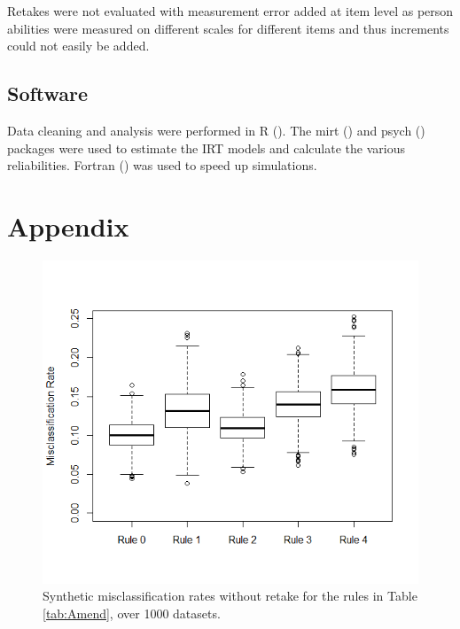 \documentclass[12pt]{article}
\begin{document}
Retakes were not evaluated with measurement error added at item level as person abilities were measured on different scales for different items and thus increments could not easily be added.

\subsection{Software}

Data cleaning and analysis were performed in R (\cite{teamLanguageEnvironmentStatistical2014}). The mirt (\cite{chalmersMirtMultidimensionalItem2012}) and psych (\cite{psych}) packages were used to estimate the IRT models and calculate the various reliabilities. Fortran (\cite{backusFortran1964}) was used to speed up simulations.

\newpage
\printbibliography
\newpage

\section*{Appendix}

\begin{figure}[htbp]
    \centering
    \includegraphics[scale=0.8]{Photos/Mis rates.png}
    \captionsetup{justification=centering}
    \caption{Synthetic misclassification rates without retake for the rules in Table \ref{tab:Amend}, over 1000 datasets.}
    \label{fig:Decisions}
\end{figure}
\end{document}
